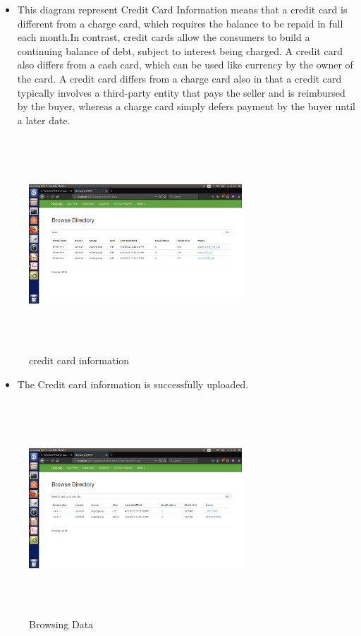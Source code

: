 \begin{itemize}
    \item 

This diagram represent Credit Card Information means that a credit card is different from a charge card, which requires the balance to be repaid in full each month.In contrast, credit cards allow the consumers to build a continuing balance of debt, subject to interest being charged. A credit card also differs from a cash card, which can be used like currency by the owner of the card. A credit card differs from a charge card also in that a credit card typically involves a third-party entity that pays the seller and is reimbursed by the buyer, whereas a charge card simply defers payment by the buyer until a later date.
\end{itemize}
\begin{figure}[htb]
\centering
\includegraphics[width=8cm,height=8cm]{3p.png}
    \caption{credit card information}
\end{figure} \newpage
\begin{itemize}
    \item The Credit card information is successfully uploaded.

 
 \end{itemize}
\begin{figure}[htb]
\centering
\includegraphics[width=8cm,height=8cm]{4p.png}
    \caption{Browsing Data}
\end{figure} \newpage
